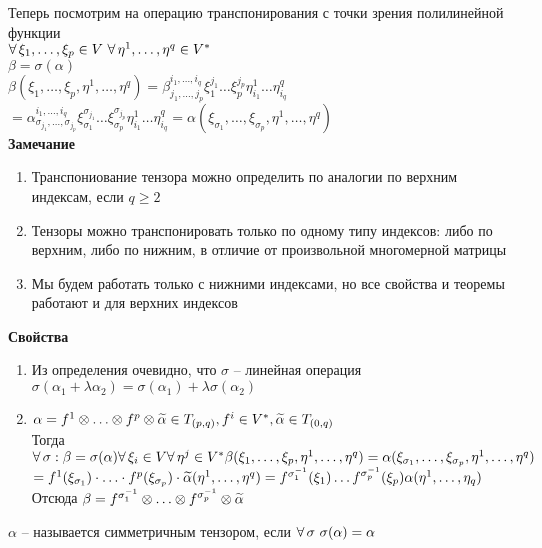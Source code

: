 \documentclass[12pt]{article}
\begin{document}
Теперь посмотрим на операцию транспонирования с точки зрения полилинейной функции\\
$\forall\, \xi_1, \ldots, \xi_p \in V\ \forall\, \eta^1,\ldots,\eta^q \in V^*$\\
$\beta=\sigma(\alpha)$\\
$\beta(\xi_1,\ldots,\xi_p,\eta^1,\ldots,\eta^q) = \beta^{i_1,\ldots,i_q}_{j_1,\ldots,j_p}\xi_1^{j_1}\ldots\xi_p^{j_p}\eta_{i_1}^1\ldots \eta_{i_q}^q$\\
$=\alpha^{i_1,\ldots,i_q}_{\sigma_{j_1},\ldots,\sigma_{j_p}}\xi_{\sigma_1}^{\sigma_{j_1}}\ldots\xi_{\sigma_p}^{\sigma_{j_p}}\eta_{i_1}^1\ldots \eta_{i_q}^q= \alpha(\xi_{\sigma_1},\ldots,\xi_{\sigma_p},\eta^1,\ldots,\eta^q)$\\
\textbf{Замечание}
\begin{enumerate}
    \item Транспониование тензора можно определить по аналогии по верхним индексам, если $q\geq 2$
    \item Тензоры можно транспонировать только по одному типу индексов: либо по верхним, либо по нижним, в отличие от произвольной многомерной матрицы
    \item Мы будем работать только с нижними индексами, но все свойства и теоремы работают и для верхних индексов
\end{enumerate}
\textbf{Свойства}
\begin{enumerate}
    \item Из определения очевидно, что $\sigma$ -- линейная операция\\
    $\sigma(\alpha_1 + \lambda\alpha_2) = \sigma(\alpha_1)+\lambda\sigma(\alpha_2)$
    \item $\alpha=f^1 \otimes \ldots \otimes f^p \otimes \widetilde \alpha \in T_{(p,q)}, f^i \in V^*, \widetilde\alpha \in T_{(0,q)}$\\
    Тогда $\forall\, \sigma: \beta=\sigma(\alpha) \forall\, \xi_i \in V \forall\, \eta^j \in V^* \beta(\xi_1,\ldots, \xi_p,\eta^1,\ldots,\eta^q)=\alpha(\xi_{\sigma_1},\ldots,\xi_{\sigma_p},\eta^1,\ldots,\eta^q)$\\
    $= f^1(\xi_{\sigma_1})\cdot \ldots \cdot f^p(\xi_{\sigma_p}) \cdot \widetilde \alpha(\eta^1,\ldots,\eta^q) = f^{\sigma^{-1}_1}(\xi_1)\ldots f^{\sigma^{-1}_p}(\xi_p) \alpha(\eta^1,\ldots,\eta_q)$\\
    Отсюда $\beta = f^{\sigma^{-1}_1} \otimes\ldots \otimes f^{\sigma^{-1}_p} \otimes \widetilde \alpha$
\end{enumerate}
$\alpha$ -- называется симметричным тензором, если $\forall\, \sigma\ \sigma(\alpha)=\alpha$\\
\end{document}
